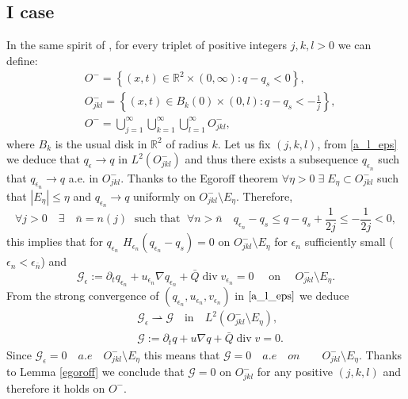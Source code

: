 \documentclass[11pt, a4paper, article,reqno,]{amsart}
\theoremstyle{remark}
\DeclareMathOperator{\dive}{div}
\numberwithin{equation}{section}
\begin{document}
\subsection*{I case}
In the same spirit of \cite{LT}, for every triplet of positive integers $j,k,l >0$ we can define:
\begin{equation*}
    \begin{aligned}
        &O^- = \left\{ (x,t) \in \mathbb{R}^2 \times (0,\infty) : q-q_s < 0\right \}, \\
        & O_{jkl}^- = \left\{ (x,t) \in B_k(0) \times (0,l): q-q_s <- \frac{1}{j} \right \}, \\
        & O^- = \bigcup_{j= 1}^{\infty} \bigcup_{k= 1}^{\infty} \bigcup_{l= 1}^{\infty} O_{jkl}^-,
    \end{aligned}
\end{equation*}
where $B_k$ is the usual disk in $\mathbb{R}^2$ of radius $k$. Let us fix $(j,k,l)$, from \eqref{a_l_eps} we deduce that $q_\epsilon \rightarrow q$ in $L^2(O_{jkl}^-)$ and thus there exists a subsequence $q_{\epsilon_n}$ such that $q_{\epsilon_n} \rightarrow q$ a.e. in $O_{jkl}^-$. Thanks to the Egoroff theorem $\forall \eta > 0 \; \exists \; E_{\eta} \subset O_{jkl}^-$  such that $|E_{\eta}| \leq \eta$ and $q_{\epsilon_n} \rightarrow q$ uniformly on $O_{jkl}^- \setminus E_{\eta}$. Therefore,
\begin{equation*}
    \forall j>0 \quad \exists \quad \bar{n} = n(j) \; \text{ such that }\; \forall n > \bar{n} \quad q_{\epsilon_n} - q_s \leq q - q_s + \frac{1}{2j} \leq -\frac{1}{2j} <0,
\end{equation*}
this implies that for $q_{\epsilon_n}$ $H_{\epsilon_n}(q_{\epsilon_n} -q_s)=0$ on $O_{jkl}^- \setminus E_{\eta}$ for $\epsilon_n$ sufficiently small ($\epsilon_n < \epsilon_{\bar{n}}$) and
\begin{equation*}
    \mathcal{G_\epsilon}:= \partial_t q_{\epsilon_n} + u_{\epsilon_n} \nabla q_{\epsilon_n} + \bar{Q} \dive v_{\epsilon_n} = 0 \quad \text{ on } \quad O_{jkl}^- \setminus E_{\eta}.
\end{equation*}
From the strong convergence of $(q_{\epsilon_n}, u_{\epsilon_n}, v_{\epsilon_n})$ in $\eqref{a_l_eps}$ we deduce 
\begin{equation*}
\begin{aligned}
    &\mathcal{G_\epsilon} \overset{}{\rightharpoonup} \mathcal{G} \quad \text{in} \quad L^2( O_{jkl}^- \setminus E_{\eta}), \\
    & \mathcal{G}:= \partial_t q + u \nabla q + \bar{Q} \dive v =0.
\end{aligned}
\end{equation*}
Since $\mathcal{G_\epsilon} = 0 \quad  a.e \quad  O_{jkl}^- \setminus E_{\eta}$ this means that $\mathcal{G} = 0 \quad  a.e \quad on \qquad  O_{jkl}^- \setminus E_{\eta}$. Thanks to Lemma \ref{egoroff} we conclude that $\mathcal{G}=0$ on $O_{jkl}^-$ for any positive $(j,k,l)$ and therefore it holds on $O^{-}$.
\end{document}
